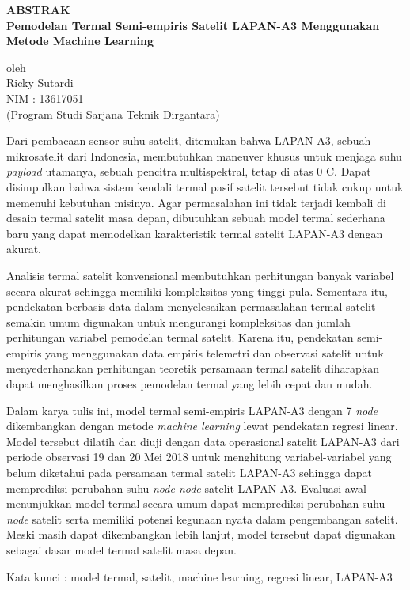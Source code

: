 \begin{center}
       \Large
       \textbf{ABSTRAK} \\
        \vspace{1.5cm}
        \large
        \textbf{Pemodelan Termal Semi-empiris Satelit LAPAN-A3 Menggunakan Metode Machine Learning}\\
        
        \vspace{1.5cm}
        
        oleh\\
        Ricky Sutardi\\
        NIM : 13617051\\
        (Program Studi Sarjana Teknik Dirgantara)\\
        \vspace{1.5cm}
\end{center}

Dari pembacaan sensor suhu satelit, ditemukan bahwa LAPAN-A3, sebuah
mikrosatelit dari Indonesia, membutuhkan maneuver khusus untuk menjaga suhu
\textit{payload} utamanya, sebuah pencitra multispektral, tetap di atas 0
\degree C. Dapat disimpulkan bahwa sistem kendali termal pasif satelit tersebut
tidak cukup untuk memenuhi kebutuhan misinya. Agar permasalahan ini tidak
terjadi kembali di desain termal satelit masa depan, dibutuhkan sebuah model
termal sederhana baru yang dapat memodelkan karakteristik termal satelit
LAPAN-A3 dengan akurat.

Analisis termal satelit konvensional membutuhkan perhitungan banyak variabel
secara akurat sehingga memiliki kompleksitas yang tinggi pula. Sementara itu,
pendekatan berbasis data dalam menyelesaikan permasalahan termal satelit
semakin umum digunakan untuk mengurangi kompleksitas dan jumlah perhitungan
variabel pemodelan termal satelit. Karena itu, pendekatan semi-empiris yang
menggunakan data empiris telemetri dan observasi satelit untuk menyederhanakan
perhitungan teoretik persamaan termal satelit diharapkan dapat menghasilkan
proses pemodelan termal yang lebih cepat dan mudah.

Dalam karya tulis ini, model termal semi-empiris LAPAN-A3 dengan 7
\textit{node} dikembangkan dengan metode \textit{machine learning}
lewat pendekatan regresi linear. Model tersebut dilatih dan diuji
dengan data operasional satelit LAPAN-A3 dari periode observasi 19 dan
20 Mei 2018 untuk menghitung variabel-variabel yang belum diketahui
pada persamaan termal satelit LAPAN-A3 sehingga dapat memprediksi
perubahan suhu \textit{node-node} satelit LAPAN-A3. Evaluasi awal
menunjukkan model termal secara umum dapat memprediksi perubahan suhu
\textit{node} satelit serta memiliki potensi kegunaan nyata dalam
pengembangan satelit. Meski masih dapat dikembangkan lebih lanjut,
model tersebut dapat digunakan sebagai dasar model termal satelit masa
depan. 

\vspace{1.0cm}
\noindent 
Kata kunci : model termal, satelit, machine learning, regresi linear, LAPAN-A3
